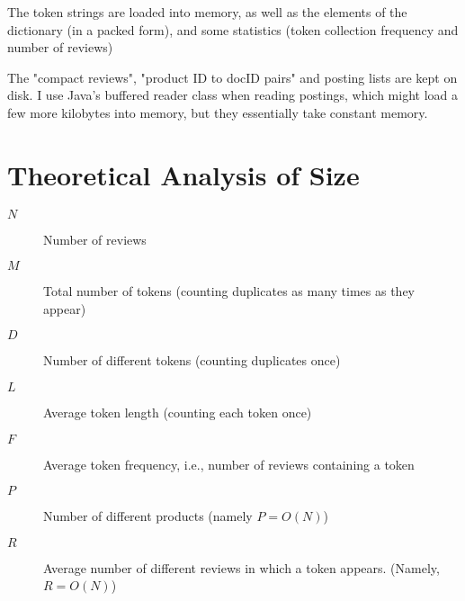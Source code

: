 \documentclass[11pt]{article}
\begin{document}
The token strings are loaded into memory, as well as the elements of the dictionary (in a packed form), and some statistics (token collection frequency
and number of reviews)

The "compact reviews", "product ID to docID pairs" and posting lists are kept on disk. I use Java's buffered reader class when reading postings, which
might load a few more kilobytes into memory, but they essentially take constant memory.

\section{Theoretical Analysis of Size}

\begin{comment}
{\em Theoretically analyze the expected size (in bytes) of all of your index structures. In your
  analysis, the size of the index should be a function of the size of the
  input.  Use the following variables to denote the various input size parameters:
}
\end{comment}
  \begin{description}
      \item[$N$] Number of reviews
      \item[$M$] Total number of tokens (counting duplicates as many times as they appear)
      \item[$D$] Number of different tokens (counting duplicates once)
      \item[$L$] Average token length (counting each token once)
      \item[$F$] Average token frequency, i.e., number of reviews containing a token
      \item[$P$] Number of different products (namely $P = O(N)$)
      \item[$R$] Average number of different reviews in which a token appears. (Namely, $R = O(N)$)
  \end{description}
\end{document}
